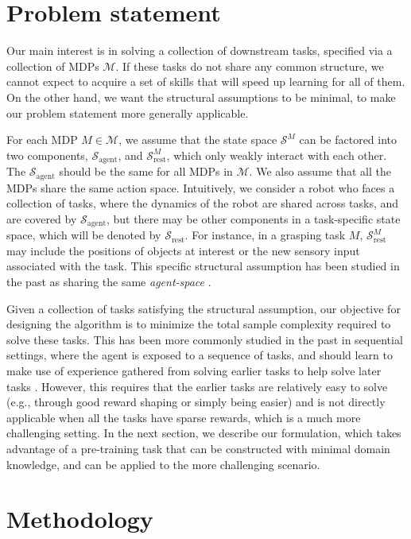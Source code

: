 \documentclass{article} %
\newcommand{\sset}{\mathcal{S}}
\newcommand{\mdpset}{\mathcal{M}}
\newcommand{\agent}{\mathrm{agent}}
\begin{document}
\section{Problem statement}

Our main interest is in solving a collection of downstream tasks, specified via a collection of MDPs $\mdpset$. If these tasks do not share any common structure, we cannot expect to acquire a set of skills that will speed up learning for all of them. On the other hand, we want the structural assumptions to be minimal, to make our problem statement more generally applicable.

For each MDP $M \in \mdpset$, we assume that the state space $\sset^M$ can be factored into two components, $\sset_\agent$, and $\sset_{\mathrm{rest}}^M$, which only weakly interact with each other.
The $\sset_\agent$ should be the same for all MDPs in $\mdpset$. We also assume that all the MDPs share the same action space.
Intuitively, we consider a robot who faces
a collection of tasks, where the dynamics of the robot are shared across tasks, and are covered by $\sset_\agent$, but there may be other components in a task-specific state space, which will be denoted by $\sset_{\mathrm{rest}}$. For instance, in a grasping task $M$, $\sset_{\mathrm{rest}}^M$ may include the positions of objects at interest or the new sensory input associated with the task. This specific structural assumption has been studied in the past as sharing the same \emph{agent-space} \citep{konidaris2007building}.

Given a collection of tasks satisfying the structural assumption, our objective for designing the algorithm is to minimize the total sample complexity required to solve these tasks. This has been more commonly studied in the past in sequential settings, where the agent is exposed to a sequence of tasks, and should learn to make use of experience gathered from solving earlier tasks to help solve later tasks \citep{taylor2009transfer, wilson2007multi, lazaric2010bayesian, devin2016learning}. However, this requires that the earlier tasks are relatively easy to solve (e.g., through good reward shaping or simply being easier) and is not directly applicable when all the tasks have sparse rewards, which is a much more challenging setting. In the next section, we describe our formulation, which takes advantage of a pre-training task that can be constructed with minimal domain knowledge, and can be applied to the more challenging scenario.

\section{Methodology}
\label{sec:method}
\end{document}
